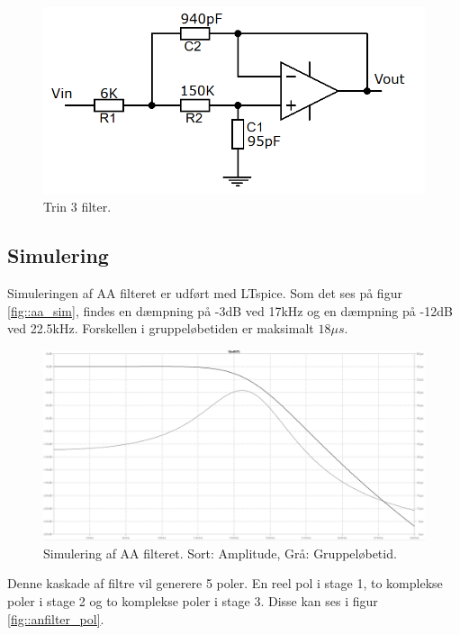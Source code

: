 \begin{figure}[h!]
	\centering
	\includegraphics[scale=0.4]{./billeder/stage3}
	\caption{Trin 3 filter.}
	\label{fig::filter_stage3}
\end{figure}
\FloatBlock
{}
\subsection{Simulering}
Simuleringen af AA filteret er udført med LTspice. Som det ses på figur \ref{fig::aa_sim}, findes en dæmpning på -3dB ved 17kHz og en dæmpning på -12dB ved 22.5kHz. Forskellen i gruppeløbetiden er maksimalt $18 \mu s$.
\begin{figure}[h!]
	\centering
	\includegraphics[scale=0.2]{./billeder/aa_sim1}
	\caption{Simulering af AA filteret. Sort: Amplitude, Grå: Gruppeløbetid.}
	\label{fig::afilter_aasim}
\end{figure}
\FloatBlock
Denne kaskade af filtre vil generere 5 poler. En reel pol i stage 1, to komplekse poler i stage 2 og to komplekse poler i stage 3. Disse kan ses i figur \ref{fig::anfilter_pol}.

